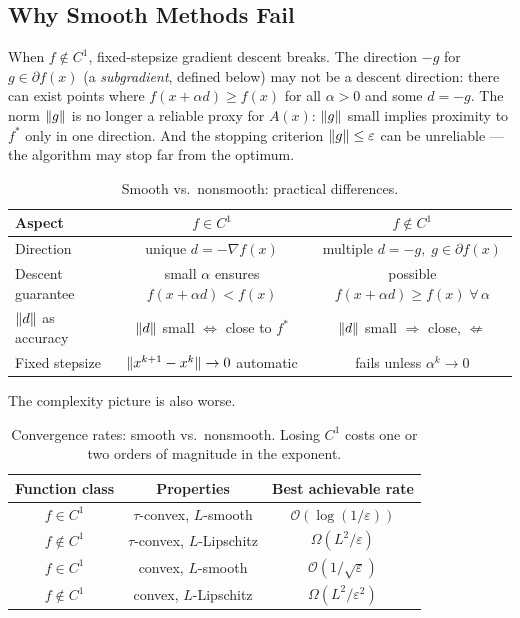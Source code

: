 \subsection{Why Smooth Methods Fail}\label{ssec:smooth-fail}

When $f \notin C^1$, fixed-stepsize gradient descent breaks.
The direction $-g$ for $g \in \partial f(x)$ (a \textit{subgradient}, defined below) may not be a descent direction: there can exist points where $f(x + \alpha d) \geq f(x)$ for all $\alpha > 0$ and some $d = -g$.
The norm $\lVert g\rVert$ is no longer a reliable proxy for $A(x)$: $\lVert g\rVert$ small implies proximity to $f^*$ only in one direction.
And the stopping criterion $\lVert g\rVert \leq \varepsilon$ can be unreliable --- the algorithm may stop far from the optimum.

\begin{table}[ht]
	\centering
	\begin{tabular}{l|c|c}
		\toprule
		Aspect & $f \in C^1$ & $f \notin C^1$ \\
		\midrule
		Direction & unique $d = -\nabla f(x)$ & multiple $d = -g,\; g \in \partial f(x)$ \\
		Descent guarantee & small $\alpha$ ensures $f(x + \alpha d) < f(x)$ & possible $f(x + \alpha d) \geq f(x)\;\forall\,\alpha$ \\
		$\lVert d\rVert$ as accuracy & $\lVert d\rVert$ small $\Leftrightarrow$ close to $f^*$ & $\lVert d\rVert$ small $\Rightarrow$ close, $\not\Leftarrow$ \\
		Fixed stepsize & $\lVert x^{k+1} - x^k\rVert \to 0$ automatic & fails unless $\alpha^k \to 0$ \\
		\bottomrule
	\end{tabular}
	\caption{Smooth vs.\ nonsmooth: practical differences.}
	\label{tab:smooth-nonsmooth-practical}
\end{table}

The complexity picture is also worse.

\begin{table}[ht]
	\centering
	\begin{tabular}{c|c|c}
		\toprule
		Function class & Properties & Best achievable rate \\
		\midrule
		$f \in C^1$ & $\tau$-convex, $L$-smooth & $\mathcal{O}(\log(1/\varepsilon))$ \\
		$f \notin C^1$ & $\tau$-convex, $L$-Lipschitz & $\Omega(L^2/\varepsilon)$ \\
		$f \in C^1$ & convex, $L$-smooth & $\mathcal{O}(1/\sqrt{\varepsilon})$ \\
		$f \notin C^1$ & convex, $L$-Lipschitz & $\Omega(L^2/\varepsilon^2)$ \\
		\bottomrule
	\end{tabular}
	\caption{Convergence rates: smooth vs.\ nonsmooth.
		Losing $C^1$ costs one or two orders of magnitude in the exponent.}
	\label{tab:smooth-vs-nonsmooth}
\end{table}


